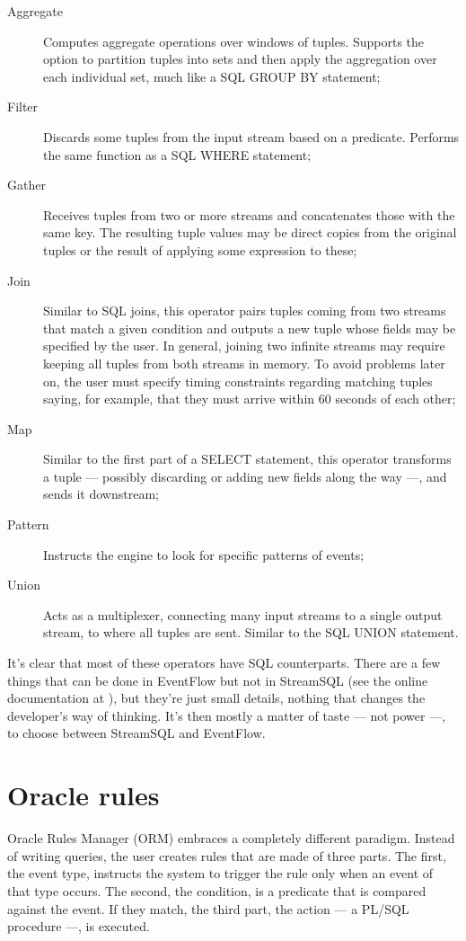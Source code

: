 \begin{description}
\item [Aggregate] Computes aggregate operations over windows of
  tuples. Supports the option to partition tuples into sets and then
  apply the aggregation over each individual set, much like a SQL
  GROUP BY statement;
\item [Filter] Discards some tuples from the input stream based on a
  predicate. Performs the same function as a SQL WHERE statement;
\item [Gather] Receives tuples from two or more streams and
  concatenates those with the same key. The resulting tuple values may
  be direct copies from the original tuples or the result of applying
  some expression to these;
\item [Join] Similar to SQL joins, this operator pairs tuples coming
  from two streams that match a given condition and outputs a new
  tuple whose fields may be specified by the user. In general, joining
  two infinite streams may require keeping all tuples from both
  streams in memory. To avoid problems later on, the user must specify
  timing constraints regarding matching tuples saying, for example,
  that they must arrive within 60 seconds of each other;
\item [Map] Similar to the first part of a SELECT statement, this
  operator transforms a tuple --- possibly discarding or adding new
  fields along the way ---, and sends it downstream;
\item [Pattern] Instructs the engine to look for specific patterns of
  events;
\item [Union] Acts as a multiplexer, connecting many input streams to
  a single output stream, to where all tuples are sent. Similar to the
  SQL UNION statement.
\end{description}

It's clear that most of these operators have SQL counterparts. There
are a few things that can be done in EventFlow but not in StreamSQL
(see the online documentation at \cite{eventflow2streamsql}), but
they're just small details, nothing that changes the developer's way
of thinking. It's then mostly a matter of taste --- not power ---, to
choose between StreamSQL and EventFlow.

\section{Oracle rules}
\label{sec:orm}

Oracle Rules Manager (ORM) \cite{orm:www} embraces a completely
different paradigm. Instead of writing queries, the user creates rules
that are made of three parts. The first, the event type, instructs the
system to trigger the rule only when an event of that type occurs. The
second, the condition, is a predicate that is compared against the
event. If they match, the third part, the action --- a PL/SQL
procedure ---, is executed.

